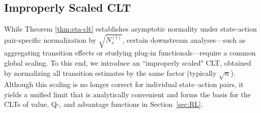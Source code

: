 \documentclass[twoside,11pt]{article}
\newcommand{\pow}[1]{^{(#1)}}%
\numberwithin{equation}{section}
\begin{document}
\subsection{Improperly Scaled CLT}
While Theorem \ref{thm:eta-clt} establishes asymptotic normality under state-action pair-specific normalization by $\sqrt{N_s \pow l}$, certain downstream analyses—such as aggregating transition effects or studying plug-in functionals—require a common global scaling. 
To this end, we introduce an ``improperly scaled" CLT, obtained by normalizing all transition estimates by the same factor (typically $\sqrt{n}$). 
Although this scaling is no longer correct for individual state–action pairs, it yields a unified limit that is analytically convenient and forms the basis for the CLTs of value, Q-, and advantage functions in Section~\ref{sec:RL}.
\end{document}
